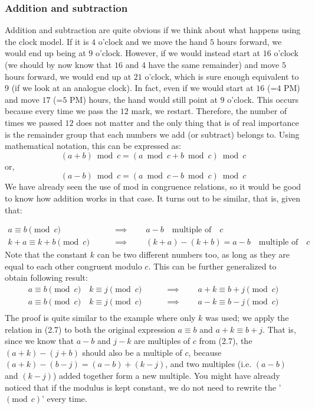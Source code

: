 \subsubsection{Addition and subtraction}
Addition and subtraction are quite obvious if we think about what happens using the clock model. If it is $4$ o'clock and we move the hand $5$ hours forward, we would end up being at $9$ o'clock. However, if we would instead start at $16$ o'clock   (we should by now know that $16$ and $4$ have the same remainder) and move $5$ hours forward, we would end up at $21$ o'clock, which is sure enough equivalent to $9$ (if we look at an analogue clock). In fact, even if we would start at $16$ (=$4$ PM) and move $17$ (=$5$ PM) hours, the hand would still point at $9$ o'clock. This occurs because every time we pass the $12$ mark, we restart. Therefore, the number of times we passed $12$ does not matter and the only thing that is of real importance is the remainder group that each numbers we add (or subtract) belongs to. Using mathematical notation, this can be expressed as: 
\begin{equation}
(a+b) \bmod c= (a \bmod c + b \bmod c) \bmod c 
\end{equation}
or,
\begin{equation}
(a-b) \bmod c= (a \bmod c - b \bmod c) \bmod c 
\end{equation}
We have already seen the  use of mod in congruence relations, so it would be good to know how addition works in that case. It turns out to be similar, that is, given that:

\begin{align*}
a \equiv b \pmod c \qquad &\implies  \qquad a-b \quad\text{multiple of} \quad c \\
k +a \equiv k+b \pmod c \qquad &\implies \qquad (k+a)-(k+b) = a-b \quad\text{multiple of} \quad c  
\end{align*}
Note that the constant $k$ can be two different numbers too, as long as they are equal to each other congruent modulo $c$. This can be further generalized to obtain following result:
\begin{align*}
a \equiv b \pmod c \quad k \equiv j \pmod c \qquad &\implies \qquad  a+k\equiv b + j \pmod c \\
a \equiv b \pmod c \quad k \equiv j \pmod c \qquad &\implies \qquad  a-k\equiv b - j \pmod c \\
\end{align*}
The proof is quite similar to the example where only $k$ was used; we apply the relation in (2.7) to both the original expression $a \equiv b$ and $a+k \equiv b+j$. That is, since we know that $a-b$ and $j-k$ are multiples of $c$ from (2.7), the $(a+k) -(j+b)$ should also be a multiple of $c$, because $(a+k)-(b-j) =(a-b) +(k-j)$, and two multiples (i.e. $(a-b)$ and $(k-j)$) added together form a new multiple. You might have already noticed that if the modulus is kept constant, we do not need to rewrite the '$(\text{mod}\phantom {c}c)$' every time. 


